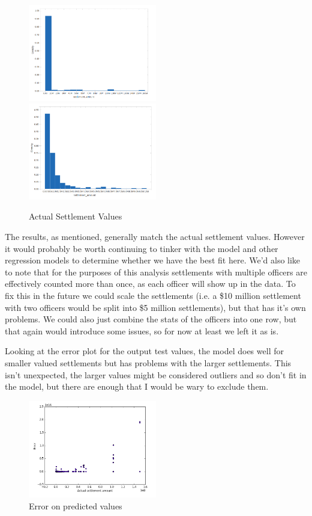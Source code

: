\documentclass[11pt]{article}
\begin{document}
\begin{figure}[h]
\caption{Actual Settlement Values}
\includegraphics[width=0.5\textwidth]{actual.png}
\includegraphics[width=0.5\textwidth]{actual2.png}
\end{figure}

The results, as mentioned, generally match the actual settlement values. However it would probably be worth continuing to tinker with the model and other regression models to determine whether we have the best fit here. We'd also like to note that for the purposes of this analysis settlements with multiple officers are effectively counted more than once, as each officer will show up in the data. To fix this in the future we could scale the settlements (i.e. a \$10 million settlement with two officers would be split into \$5 million settlements), but that has it's own problems. We could also just combine the stats of the officers into one row, but that again would introduce some issues, so for now at least we left it as is.

Looking at the error plot for the output test values, the model does well for smaller valued settlements but has problems with the larger settlements. This isn't unexpected, the larger values might be considered outliers and so don't fit in the model, but there are enough that I would be wary to exclude them.

\begin{figure}[h]
\centering
\caption{Error on predicted values}
\includegraphics[width=0.5\textwidth]{errplot.png}
\end{figure}
\end{document}
